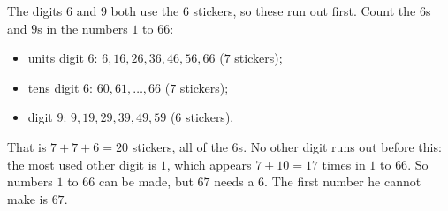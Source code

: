 The digits $6$ and $9$ both use the $6$ stickers, so these run out first. Count the $6$s and $9$s in the numbers $1$ to $66$:
\begin{itemize}
\item units digit $6$: $6,16,26,36,46,56,66$ ($7$ stickers);
\item tens digit $6$: $60,61,\dots,66$ ($7$ stickers);
\item digit $9$: $9,19,29,39,49,59$ ($6$ stickers).
\end{itemize}
That is $7+7+6=20$ stickers, all of the $6$s. No other digit runs out before this: the most used other digit is $1$, which appears $7+10=17$ times in $1$ to $66$. So numbers $1$ to $66$ can be made, but $67$ needs a $6$. The first number he cannot make is $\boxed{67}$.
